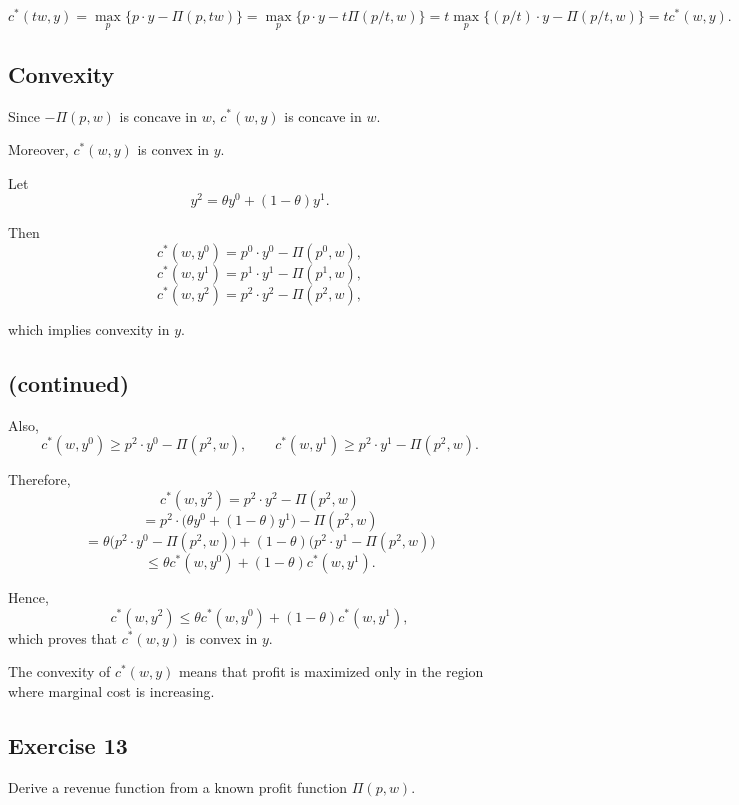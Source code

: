 \[
c^*(tw,y)
=
\max_p \{p\cdot y - \Pi(p,tw)\}
=
\max_p \{p\cdot y - t\Pi(p/t,w)\}
=
t\max_p \{(p/t)\cdot y - \Pi(p/t,w)\}
=
t c^*(w,y).
\]

\subsection*{Convexity}

Since $-\Pi(p,w)$ is concave in $w$, $c^*(w,y)$ is concave in $w$.

Moreover, $c^*(w,y)$ is convex in $y$.

Let
\[
y^2=\theta y^0 + (1-\theta)y^1.
\]

Then
\[
c^*(w,y^0)=p^0\cdot y^0 - \Pi(p^0,w),
\]
\[
c^*(w,y^1)=p^1\cdot y^1 - \Pi(p^1,w),
\]
\[
c^*(w,y^2)=p^2\cdot y^2 - \Pi(p^2,w),
\]

which implies convexity in $y$.




\subsection*{(continued)}

Also,
\[
c^*(w,y^0) \ge p^2 \cdot y^0 - \Pi(p^2,w),
\qquad
c^*(w,y^1) \ge p^2 \cdot y^1 - \Pi(p^2,w).
\]

Therefore,
\[
c^*(w,y^2)
=
p^2 \cdot y^2 - \Pi(p^2,w)
\]
\[
=
p^2 \cdot \bigl(\theta y^0 + (1-\theta)y^1\bigr) - \Pi(p^2,w)
\]
\[
=
\theta \bigl(p^2 \cdot y^0 - \Pi(p^2,w)\bigr)
+
(1-\theta)\bigl(p^2 \cdot y^1 - \Pi(p^2,w)\bigr)
\]
\[
\le
\theta c^*(w,y^0) + (1-\theta)c^*(w,y^1).
\]

Hence,
\[
c^*(w,y^2)
\le
\theta c^*(w,y^0) + (1-\theta)c^*(w,y^1),
\]
which proves that $c^*(w,y)$ is convex in $y$.

\medskip

The convexity of $c^*(w,y)$ means that profit is maximized only in the region
where marginal cost is increasing.


\begin{tcolorbox}

\subsection*{Exercise 13}

Derive a revenue function from a known profit function $\Pi(p,w)$.

\end{tcolorbox}



